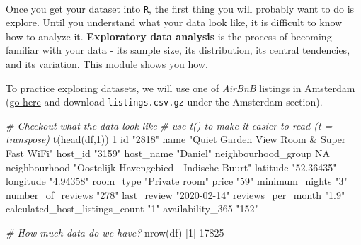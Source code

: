 \documentclass[
]{book}
\newenvironment{Shaded}{\begin{snugshade}}{\end{snugshade}}
\newcommand{\CommentTok}[1]{\textcolor[rgb]{0.56,0.35,0.01}{\textit{#1}}}
\newcommand{\ConstantTok}[1]{\textcolor[rgb]{0.00,0.00,0.00}{#1}}
\newcommand{\DecValTok}[1]{\textcolor[rgb]{0.00,0.00,0.81}{#1}}
\newcommand{\FunctionTok}[1]{\textcolor[rgb]{0.00,0.00,0.00}{#1}}
\newcommand{\NormalTok}[1]{#1}
\newcommand{\StringTok}[1]{\textcolor[rgb]{0.31,0.60,0.02}{#1}}
\begin{document}
~

Once you get your dataset into \texttt{R}, the first thing you will probably want to do is explore. Until you understand what your data look like, it is difficult to know how to analyze it. \textbf{Exploratory data analysis} is the process of becoming familiar with your data - its sample size, its distribution, its central tendencies, and its variation. This module shows you how.

To practice exploring datasets, we will use one of \emph{AirBnB} listings in Amsterdam (\href{http://insideairbnb.com/get-the-data.html}{go here} and download \texttt{listings.csv.gz} under the Amsterdam section).

\begin{Shaded}
\begin{Highlighting}[]
\CommentTok{\# Checkout what the data look like}
\CommentTok{\# use t() to make it easier to read (t = transpose)}
\FunctionTok{t}\NormalTok{(}\FunctionTok{head}\NormalTok{(df,}\DecValTok{1}\NormalTok{))}
                               \DecValTok{1}                                         
\NormalTok{id                             }\StringTok{"2818"}                                    
\NormalTok{name                           }\StringTok{"Quiet Garden View Room \& Super Fast WiFi"}
\NormalTok{host\_id                        }\StringTok{"3159"}                                    
\NormalTok{host\_name                      }\StringTok{"Daniel"}                                  
\NormalTok{neighbourhood\_group            }\ConstantTok{NA}                                        
\NormalTok{neighbourhood                  }\StringTok{"Oostelijk Havengebied {-} Indische Buurt"}  
\NormalTok{latitude                       }\StringTok{"52.36435"}                                
\NormalTok{longitude                      }\StringTok{"4.94358"}                                 
\NormalTok{room\_type                      }\StringTok{"Private room"}                            
\NormalTok{price                          }\StringTok{"59"}                                      
\NormalTok{minimum\_nights                 }\StringTok{"3"}                                       
\NormalTok{number\_of\_reviews              }\StringTok{"278"}                                     
\NormalTok{last\_review                    }\StringTok{"2020{-}02{-}14"}                              
\NormalTok{reviews\_per\_month              }\StringTok{"1.9"}                                     
\NormalTok{calculated\_host\_listings\_count }\StringTok{"1"}                                       
\NormalTok{availability\_365               }\StringTok{"152"}                                     

\CommentTok{\# How much data do we have?}
\FunctionTok{nrow}\NormalTok{(df)}
\NormalTok{[}\DecValTok{1}\NormalTok{] }\DecValTok{17825}
\end{Highlighting}
\end{Shaded}
\end{document}
